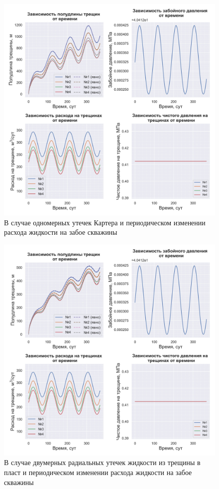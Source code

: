 \begin{figure}[H] 
\center
\includegraphics[width=\linewidth]{images/myimage3.jpg}
\caption{В случае одномерных утечек Картера и периодическом изменении расхода жидкости на забое скважины} 
\label{fig:myimage3}
\end{figure}


\begin{figure}[H] 
\center
\includegraphics[width=\linewidth]{images/myimage4.jpg}
\caption{В случае двумерных радиальных утечек жидкости из трещины в пласт и периодическом изменении расхода жидкости на забое скважины}
\label{fig:myimage4}
\end{figure}


